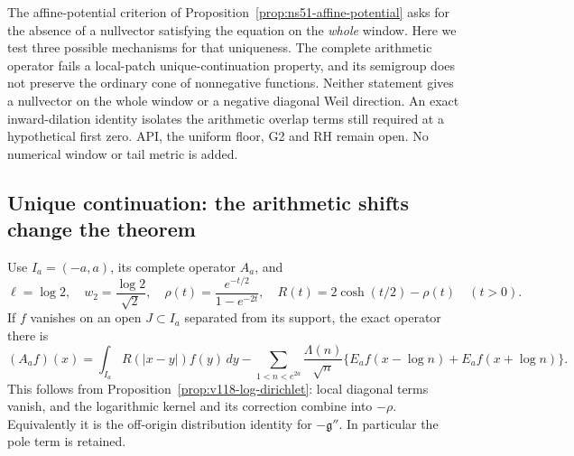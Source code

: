\documentclass[11pt]{article}
\theoremstyle{remark}
\begin{document}
The affine-potential criterion of Proposition~\ref{prop:ns51-affine-potential}
asks for the absence of a nullvector satisfying the equation on the
\emph{whole} window. Here we test three possible mechanisms for that
uniqueness. The complete arithmetic operator fails a local-patch
unique-continuation property, and its semigroup does not preserve the
ordinary cone of nonnegative functions. Neither statement gives a
nullvector on the whole window or a negative diagonal Weil direction.
An exact inward-dilation identity isolates the arithmetic overlap
terms still required at a hypothetical first zero. API, the uniform
floor, G2 and RH remain open. No numerical window or tail metric is added.

\subsection*{Unique continuation: the arithmetic shifts change the theorem}

Use $I_a=(-a,a)$, its complete operator $A_a$, and
\[
 \ell=\log2,\quad w_2=\frac{\log2}{\sqrt2},\quad
 \rho(t)=\frac{e^{-t/2}}{1-e^{-2t}},\quad
 R(t)=2\cosh(t/2)-\rho(t)\quad(t>0).
\]
If $f$ vanishes on an open $J\subset I_a$ separated from its support,
the exact operator there is
\begin{equation}\label{eq:ns55-off-support-operator}
 (A_af)(x)=\int_{I_a}R(|x-y|)f(y)\,dy
 -\sum_{1<n<e^{2a}}\frac{\Lambda(n)}{\sqrt n}
       \{E_af(x-\log n)+E_af(x+\log n)\}.
\end{equation}
This follows from Proposition~\ref{prop:v118-log-dirichlet}: local
diagonal terms vanish, and the logarithmic kernel and its correction
combine into $-\rho$. Equivalently it is the off-origin distribution
identity for $-\mathfrak g''$. In particular the pole term is retained.
\end{document}
